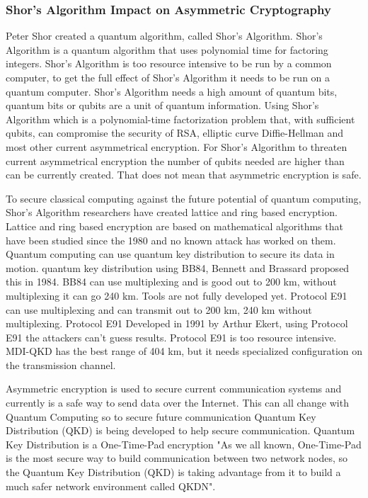\documentclass[sigconf]{acmart}
\begin{document}
\subsubsection{Shor's Algorithm Impact on Asymmetric Cryptography}
Peter Shor created a quantum algorithm, called Shor's Algorithm. Shor's Algorithm is a quantum algorithm that uses polynomial time for factoring integers. Shor's Algorithm is too resource intensive to be run by a common computer, to get the full effect of Shor's Algorithm it needs to be run on a quantum computer. Shor's Algorithm needs a high amount of quantum bits, quantum bits or qubits are a unit of quantum information. Using Shor's Algorithm which is a polynomial-time factorization problem that, with sufficient qubits, can compromise the security of RSA, elliptic curve Diffie-Hellman and most other current asymmetrical encryption. For Shor's Algorithm to threaten current asymmetrical encryption the number of qubits needed are higher than can be currently created. That does not mean that asymmetric encryption is safe\cite{shor_polynomial-time_1997}.

To secure classical computing against the future potential of quantum computing, Shor's Algorithm researchers have created lattice and ring based encryption. Lattice and ring based encryption are based on mathematical algorithms that have been studied since the 1980 and no known attack has worked on them. Quantum computing can use quantum key distribution to secure its data in motion. quantum key distribution using BB84, Bennett and Brassard proposed this in 1984. BB84 can use multiplexing and is good out to 200 km, without multiplexing it can go 240 km. Tools are not fully developed yet. Protocol E91 can use multiplexing and can transmit out to 200 km, 240 km without multiplexing. Protocol E91 Developed in 1991 by Arthur Ekert, using Protocol E91 the attackers can't guess results. Protocol E91 is too resource intensive. MDI-QKD has the best range of 404 km, but it needs specialized configuration on the transmission channel. 

Asymmetric encryption is used to secure current communication systems and currently is a safe way to send data over the Internet. This can all change with Quantum Computing so to secure future communication Quantum Key Distribution (QKD) is being developed to help secure communication. Quantum Key Distribution is a One-Time-Pad encryption "As we all known, One-Time-Pad is the most secure way to build communication between two network nodes, so the Quantum Key Distribution (QKD) is taking advantage from it to build a much safer network environment called QKDN"\cite{liu_multi-path_2019}.
\end{document}
